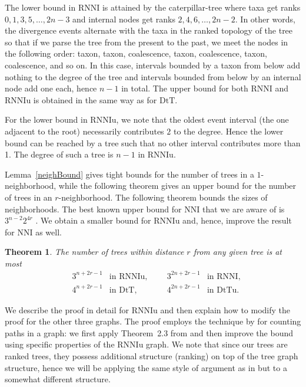 \documentclass[11pt]{amsart}
\newtheorem{theorem}[lemma]{Theorem}
\theoremstyle{definition}
\newcommand{\nni}{\mathrm{NNI}}
\newcommand{\rnni}{\mathrm{RNNI}}
\newcommand{\rnniu}{\mathrm{RNNIu}}
\newcommand{\dtt}{\mathrm{DtT}}
\newcommand{\dttu}{\mathrm{DtTu}}
\begin{document}
The lower bound in $\rnni$ is attained by the caterpillar-tree where taxa get ranks $0, 1, 3, 5, \ldots, 2n-3$ and internal nodes get ranks $2, 4, 6, \ldots, 2n-2$.
In other words, the divergence events alternate with the taxa in the ranked topology of the tree so that if we parse the tree from the present to the past, we meet the nodes in the following order: taxon, taxon, coalescence, taxon, coalescence, taxon, coalescence, and so on.
In this case, intervals bounded by a taxon from below add nothing to the degree of the tree and intervals bounded from below by an internal node add one each, hence $n-1$ in total.
The upper bound for both $\rnni$ and $\rnniu$ is obtained in the same way as for $\dtt$.

For the lower bound in $\rnniu$, we note that the oldest event interval (the one adjacent to the root) necessarily contributes $2$ to the degree.
Hence the lower bound can be reached by a tree such that no other interval contributes more than 1.
The degree of such a tree is $n-1$ in $\rnniu$.
\endproof

Lemma~\ref{neighBound} gives tight bounds for the number of trees in a $1$-neighborhood, while the following theorem gives an upper bound for the number of trees in an $r$-neighborhood.
The following theorem bounds the sizes of neighborhoods.
The best known upper bound for $\nni$ that we are aware of is $3^{n-2} 2^{4r}$ \autocite{li1996some}.
We obtain a smaller bound for $\rnniu$ and, hence, improve the result for $\nni$ as well.

\begin{theorem}
\label{neighSizeTh}
The number of trees within distance $r$ from any given tree is at most
\begin{align*}
& 3^{n+2r-1}	& \mbox{in $\rnniu$,}
&&& 3^{2n+2r-1}	& \mbox{in $\rnni$,}\\
& 4^{n+2r-1}	& \mbox{in $\dtt$,}
&&& 4^{2n+2r-1}	& \mbox{in $\dttu$.}
\end{align*}
\end{theorem}

\proof
We describe the proof in detail for $\rnniu$ and then explain how to modify the proof for the other three graphs.
The proof employs the technique by \textcite{Sleator1992-bp} for counting paths in a graph: we first apply Theorem~2.3 from \autocite{Sleator1992-bp} and then improve the bound using specific properties of the $\rnniu$ graph.
We note that since our trees are ranked trees, they possess additional structure (ranking) on top of the tree graph structure, hence we will be applying the same style of argument as in \autocite{Sleator1992-bp} but to a somewhat different structure.
\end{document}
